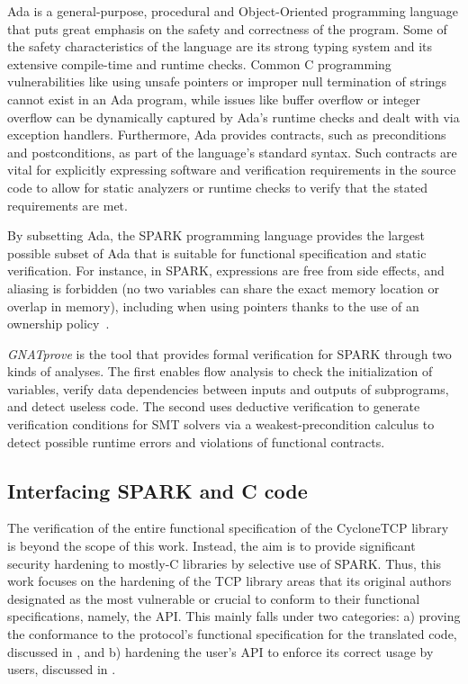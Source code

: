 \documentclass[conference]{IEEEtran}
\begin{document}
Ada is a general-purpose, procedural and Object-Oriented programming language that puts great emphasis on the safety and correctness of the program. Some of the safety characteristics of the language are its strong typing system and its extensive compile-time and runtime checks. Common C programming vulnerabilities like using unsafe pointers or improper null termination of strings cannot exist in an Ada program, while issues like buffer overflow or integer overflow can be dynamically captured by Ada’s runtime checks and dealt with via exception handlers. Furthermore, Ada provides contracts, such as preconditions and postconditions, as part of the language’s standard syntax. Such contracts are vital for explicitly expressing software and verification requirements in the source code to allow for static analyzers or runtime checks to verify that the stated requirements are met.

By subsetting Ada, the SPARK programming language \cite{mccormick_chapin_2015} provides the largest possible subset of Ada that is suitable for functional specification and static verification. For instance, in SPARK, expressions are free from side effects, and aliasing is forbidden (no two variables can share the exact memory location or overlap in memory), including when using pointers thanks to the use of an ownership policy~\cite{dross2020recursive}.

\emph{GNATprove} \cite{GNATProve:users_manual} is the tool that provides formal verification for SPARK through two kinds of analyses. The first enables flow analysis to check the initialization of variables, verify data dependencies between inputs and outputs of subprograms, and detect useless code. The second uses deductive verification to generate verification conditions for SMT solvers via a weakest-precondition calculus to detect possible runtime errors and violations of functional contracts.



\subsection{Interfacing SPARK and C code}

The verification of the entire functional specification of the CycloneTCP library is beyond the scope of this work. Instead, the aim is to provide significant security hardening to mostly-C libraries by selective use of SPARK. Thus, this work focuses on the hardening of the TCP library areas that its original authors designated as the most vulnerable or crucial to conform to their functional specifications, namely, the API. This mainly falls under two categories: a) proving the conformance to the protocol's functional specification for the translated code, discussed in , and b) hardening the user's API to enforce its correct usage by users, discussed in .
\end{document}

